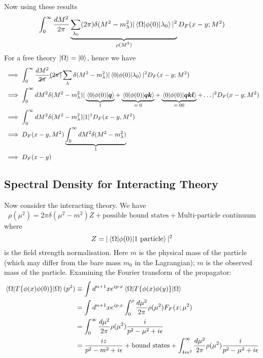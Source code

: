 Now using these results 
\begin{align}
    \int_{0}^{\infty}  \frac{dM^2}{2\pi}  \underbrace{\sum_{\lambda_0} (2\pi)  \delta (M^2 - m_{\lambda}^{2}) |\mel{\Omega}{\phi(0)}{\lambda_0}|^2}_\text{$\rho(M^2)$} D_F(x - y; M^2)
\end{align}
For a free theory $\ket{\Omega} = \ket{0}$, hence we have
\begin{align}
    & \implies \int_{0}^{\infty}  \frac{dM^2}{\cancel{2\pi}}\cancel{(2\pi)} \sum_{\lambda}   \delta (M^2 - m_{\lambda}^{2}) |\mel{0}{\phi(0)}{\lambda_0}|^2 D_F(x - y; M^2) \nonumber\\
    & \implies \int_{0}^{\infty} dM^2    \delta (M^2 - m_{\lambda}^{2}) | \underbrace{ \mel{0}{\phi(0)}{\bm{q}} }_\text{$1$}  +  \underbrace{ \mel{0}{\phi(0)}{\bm{q} \bm{k} }}_\text{$ = 0$}  +  \underbrace{ \mel{0}{\phi(0)}{\bm{q} \bm{k}  \bm{l} } }_\text{$ = 00$}+ \dots  |^2 D_F(x - y; M^2) \nonumber\\
    & \implies \int_{0}^{\infty} dM^2 \delta(M^2 - m_{\lambda}^{2}) |1|^1 D_F (x - y, M^2) \nonumber\\
    & \implies  D_F (x - y, M^2) \underbrace{\int_{0}^{\infty} dM^2 \delta(M^2 - m_{\lambda}^{2})}_\text{$1$} \nonumber\\
    & \implies D_F (x - y)
\end{align}
\subsection{Spectral Density for Interacting Theory}
Now consider the interacting theory. We have
\begin{equation}
    \rho(\mu^2) = 2\pi \delta (\mu^2 - m^2) Z + \text{possible bound states} + \text{Multi-particle continuum}
\end{equation}
where 
\begin{equation}
    Z = |\mel{\Omega}{\phi(0)}{1 \text{ particle}}|^2
\end{equation}
is the field strength normalisation. Here $m$ is the physical mass of the particle (which may differ from the bare mass $m_0$ in the Lagrangian); $m$ is the observed mass of the particle. Examining the Fourier transform of the propagator:
\begin{align}
    \mel{\Omega}{  T\{ \phi(x) \phi(0)  \} }{\Omega} (p^2) & \equiv \int d^{n+1} x e^{ip\cdot x} \mel{\Omega}{ T\{  \phi(x) \phi(y) \} }{\Omega} \nonumber\\
    & = \int d^{n+1} x e^{ip\cdot x} \int_{0}^{\rho} \frac{d\mu^2}{2\pi} \rho(\mu^2) F_{F}(x; \mu^2) \nonumber\\
    & = \int_{0}^{\infty} \frac{d\mu^2}{2\pi} \rho(\mu^2) \frac{i}{p^2 - \mu^2 + i\epsilon} \nonumber\\
    & = \frac{iz}{p^2 - m^2 + i\epsilon} + \text{bound states} + \int_{4m^2}^{\infty} \frac{d\mu^2}{2\pi} \rho(\mu^2) \frac{i}{p^2 - \mu^2 + i\epsilon} 
\end{align}
 
